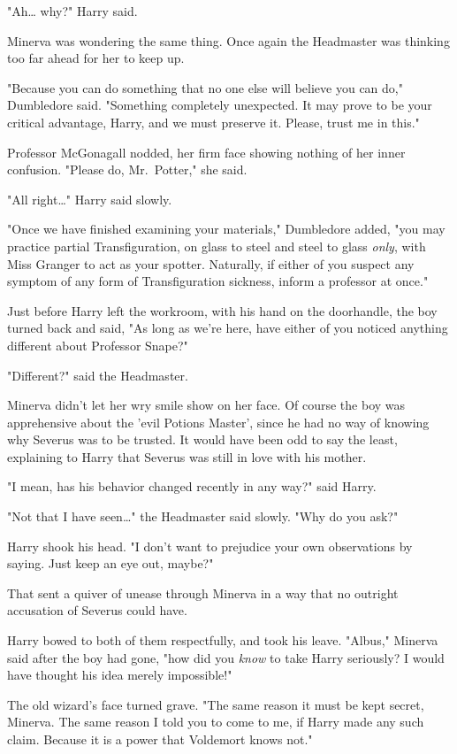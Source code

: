 "Ah{\ldots} why?" Harry said.

Minerva was wondering the same thing. Once again the Headmaster was thinking 
too far ahead for her to keep up.

"Because you can do something that no one else will believe you can do," 
Dumbledore said. "Something completely unexpected. It may prove to be your 
critical advantage, Harry, and we must preserve it. Please, trust me in this."

Professor McGonagall nodded, her firm face showing nothing of her inner 
confusion. "Please do, Mr.~Potter," she said.

"All right{\ldots}" Harry said slowly.

"Once we have finished examining your materials," Dumbledore added, "you may 
practice partial Transfiguration, on glass to steel and steel to glass 
\emph{only}, with Miss Granger to act as your spotter. Naturally, if either of 
you suspect any symptom of any form of Transfiguration sickness, inform a 
professor at once."

Just before Harry left the workroom, with his hand on the doorhandle, the boy 
turned back and said, "As long as we're here, have either of you noticed 
anything different about Professor Snape?"

"Different?" said the Headmaster.

Minerva didn't let her wry smile show on her face. Of course the boy was 
apprehensive about the 'evil Potions Master', since he had no way of knowing 
why Severus was to be trusted. It would have been odd to say the least, 
explaining to Harry that Severus was still in love with his mother.

"I mean, has his behavior changed recently in any way?" said Harry.

"Not that I have seen{\ldots}" the Headmaster said slowly. "Why do you ask?"

Harry shook his head. "I don't want to prejudice your own observations by 
saying. Just keep an eye out, maybe?"

That sent a quiver of unease through Minerva in a way that no outright 
accusation of Severus could have.

Harry bowed to both of them respectfully, and took his leave.
\sbreak
"Albus," Minerva said after the boy had gone, "how did you \emph{know} to take 
Harry seriously? I would have thought his idea merely impossible!"

The old wizard's face turned grave. "The same reason it must be kept secret, 
Minerva. The same reason I told you to come to me, if Harry made any such 
claim. Because it is a power that Voldemort knows not."

